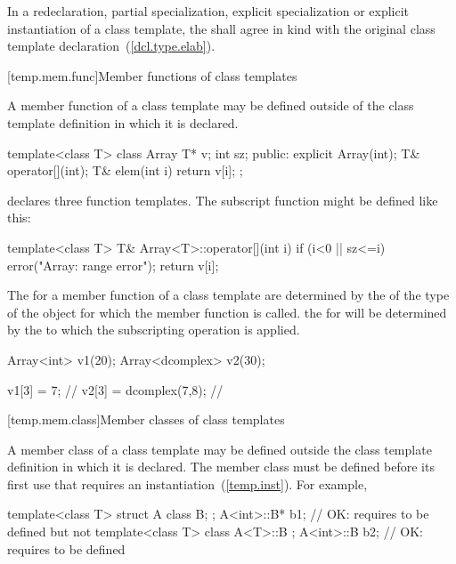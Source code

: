 \exitexample

\pnum
In a redeclaration, partial
specialization,
explicit specialization or explicit
instantiation of a class template, the
shall agree in kind with the original class template declaration~(\ref{dcl.type.elab}).

[temp.mem.func]{Member functions of class templates}

\pnum
{}%
A member function
of a class template
may be defined outside of the class
template definition in which it is declared.
\enterexample

\begin{codeblock}
template<class T> class Array {
  T* v;
  int sz;
public:
  explicit Array(int);
  T& operator[](int);
  T& elem(int i) { return v[i]; }
};
\end{codeblock}

declares three function templates.
The subscript function might be defined like this:

\begin{codeblock}
template<class T> T& Array<T>::operator[](int i) {
  if (i<0 || sz<=i) error("Array: range error");
  return v[i];
}
\end{codeblock}
\exitexample

\pnum
The
for a member function of a class template are determined by the
of the type of the object for which the member function is called.
\enterexample
the
for
will be determined by the
to which the subscripting operation is applied.

\begin{codeblock}
Array<int> v1(20);
Array<dcomplex> v2(30);

v1[3] = 7;                      // 
v2[3] = dcomplex(7,8);          // 
\end{codeblock}
\exitexample

[temp.mem.class]{Member classes of class templates}

\pnum
A member class of a class template may be defined outside the class template
definition in which it is declared.
\enternote
The member class must be defined before its first use that requires
an instantiation~(\ref{temp.inst}).
For example,

\begin{codeblock}
template<class T> struct A {
  class B;
};
A<int>::B* b1;                  // OK: requires  to be defined but not 
template<class T> class A<T>::B { };
A<int>::B  b2;                  // OK: requires  to be defined
\end{codeblock}
\exitnote

